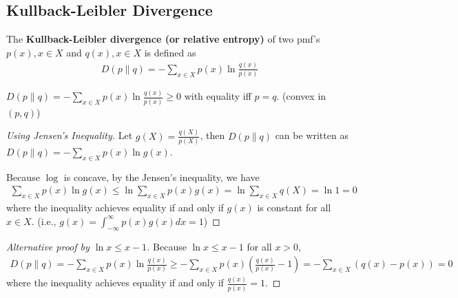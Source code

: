\documentclass[11pt]{elegantbook}
\begin{document}
\subsection{Kullback-Leibler Divergence}
\begin{definition}
    The \textbf{Kullback-Leibler divergence (or relative entropy)} of two pmf's $p(x), x\in X$ and $q(x), x\in X$ is defined as
    \begin{equation}
        \begin{aligned}
            D(p\| q)=-\sum_{x\in X}p(x)\ln\frac{q(x)}{p(x)}
        \end{aligned}
        \nonumber
    \end{equation}
\end{definition}
\begin{proposition}[Positivity]
    $D(p\| q)=-\sum_{x\in X}p(x)\ln\frac{q(x)}{p(x)}\geq 0$ with equality iff $p=q$. (convex in $(p,q)$)
\end{proposition}
\begin{proof}[Using Jensen's Inequality]
    Let $g(X)=\frac{q(X)}{p(X)}$, then $D(p\| q)$ can be written as $D(p\| q)=-\sum_{x\in X}p(x)\ln g(x)$.

    Because $\log$ is concave, by the Jensen's inequality, we have
    \begin{equation}
        \begin{aligned}
            \sum_{x\in X}p(x)\ln g(x)\leq \ln \sum_{x\in X}p(x) g(x)=\ln\sum_{x\in X} q(X)=\ln 1=0
        \end{aligned}
        \nonumber
    \end{equation}
    where the inequality achieves equality if and only if $g(x)$ is constant for all $x\in X$. (i.e., $g(x)=\int_{-\infty}^\infty p(x)g(x)dx=1$)
\end{proof}
\begin{proof}[Alternative proof by $\ln x\leq x-1$]
    Because $\ln x\leq x-1$ for all $x>0$,
    \begin{equation}
        \begin{aligned}
            D(p\| q)=-\sum_{x\in X}p(x)\ln\frac{q(x)}{p(x)}\geq -\sum_{x\in X}p(x)\left(\frac{q(x)}{p(x)}-1\right)=-\sum_{x\in X}\left(q(x)-p(x)\right)=0
        \end{aligned}
        \nonumber
    \end{equation}
    where the inequality achieves equality if and only if $\frac{q(x)}{p(x)}=1$.
\end{proof}
\end{document}

